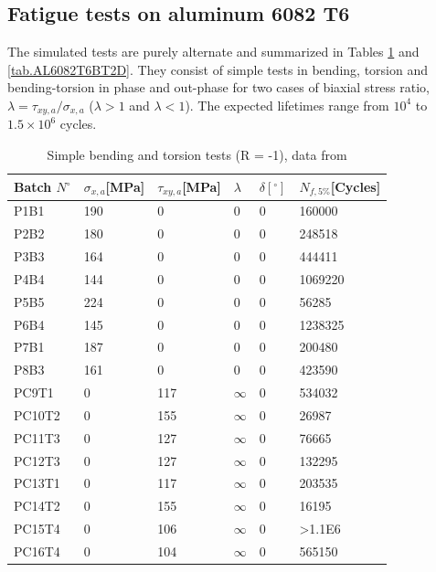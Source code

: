 \subsection{Fatigue tests on aluminum 6082 T6}
The simulated tests are purely alternate and summarized in Tables \ref{tab.AL6082T6BT1D} and \ref{tab.AL6082T6BT2D}. They consist of simple tests in bending, torsion and bending-torsion in phase and out-phase for two cases of biaxial stress ratio, $\lambda=\tau_{xy,a}/\sigma_{x,a}$
($\lambda>1$ and $\lambda<1$). The expected lifetimes range from $10^4$ to $1.5\times10^6$ cycles. 
\begin{table}[!h]
\centering
\begin{tabular}{|l|l|l|l|l|l|}
\hline
Batch $N^\circ$ & $\sigma_{x,a}${[}MPa{]} & $\tau_{xy,a}${[}MPa{]} & $\lambda$ & $\delta [^\circ]$ & $N_{f,5\%}${[}Cycles{]} \\ \hline
P1B1 & 190 & 0 & 0 & 0 & 160000 \\ \hline
P2B2 & 180 & 0 & 0 & 0 & 248518 \\ \hline
P3B3 & 164 & 0 & 0 & 0 & 444411 \\ \hline
P4B4 & 144 & 0 & 0 & 0 & 1069220 \\ \hline
P5B5 & 224 & 0 & 0 & 0 & 56285 \\ \hline
P6B4 & 145 & 0 & 0 & 0 & 1238325 \\ \hline
P7B1 & 187 & 0 & 0 & 0 & 200480 \\ \hline
P8B3 & 161 & 0 & 0 & 0 & 423590 \\ \hline
PC9T1 & 0 & 117 & $\infty$ & 0 & 534032 \\ \hline
PC10T2 & 0 & 155 & $\infty$ & 0 & 26987 \\ \hline
PC11T3 & 0 & 127 & $\infty$ & 0 & 76665 \\ \hline
PC12T3 & 0 & 127 & $\infty$ & 0 & 132295 \\ \hline
PC13T1 & 0 & 117 & $\infty$ & 0 & 203535 \\ \hline
PC14T2 & 0 & 155 & $\infty$ & 0 & 16195 \\ \hline
PC15T4 & 0 & 106 & $\infty$ & 0 & \textgreater1.1E6 \\ \hline
PC16T4 & 0 & 104 & $\infty$ & 0 & 565150 \\ \hline
\end{tabular}
\caption{Simple bending and torsion tests (R = -1), data from \cite{susmel2003multiaxial}}
\label{tab.AL6082T6BT1D}
\end{table}
